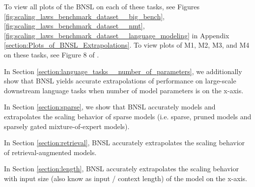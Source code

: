 \documentclass{article} %
\begin{document}



\vspace{-2.1mm}

To view all plots of the BNSL on each of these tasks, see Figures
\ref{fig:scaling_laws_benchmark_dataset__big_bench},
\ref{fig:scaling_laws_benchmark_dataset__nmt},
\ref{fig:scaling_laws_benchmark_dataset__language_modeling} in Appendix \ref{section:Plots_of_BNSL_Extrapolations}. To view plots of M1, M2, M3, and M4 on these tasks, see Figure 8 of \cite{Alabdulmohsi2022revisiting}.

\vspace{-0.6mm}

In Section \ref{section:language_tasks__number_of_parameters}, we additionally show that BNSL yields accurate extrapolations of performance on large-scale downstream language tasks when number of model parameters is on the x-axis.

\vspace{-2.1mm}

In Section \ref{section:sparse}, we show that BNSL accurately models and extrapolates the scaling behavior of sparse models (i.e. sparse, pruned models and sparsely gated mixture-of-expert models).

\vspace{-2.1mm}

In Section \ref{section:retrieval}, BNSL accurately extrapolates the scaling behavior of retrieval-augmented models.

\vspace{-2.1mm}

In Section \ref{section:length}, BNSL accurately extrapolates the scaling behavior with input size (also know as input / context length) of the model on the x-axis.

\vspace{-2.1mm}
\end{document}
